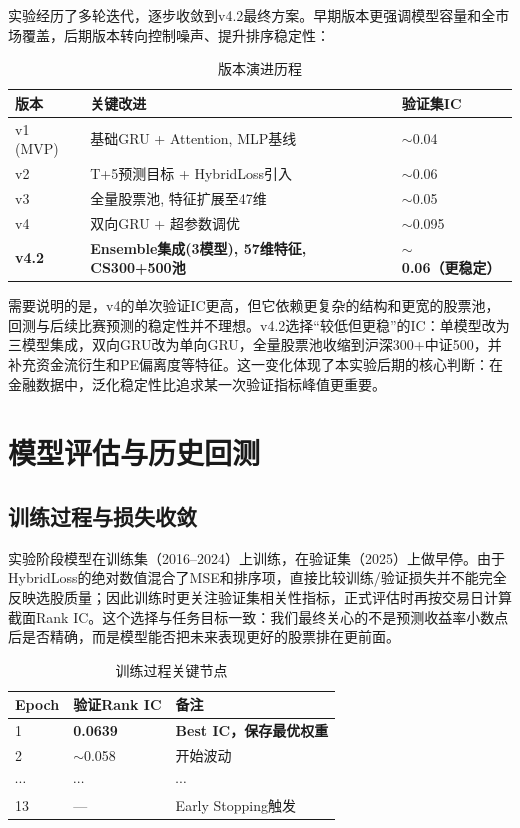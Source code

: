 \documentclass[10pt,a4paper]{ctexart}
\begin{document}
实验经历了多轮迭代，逐步收敛到v4.2最终方案。早期版本更强调模型容量和全市场覆盖，后期版本转向控制噪声、提升排序稳定性：

\begin{table}[htbp]
    \centering
    \caption{版本演进历程}
    \small
    \begin{tabular}{p{2.0cm}p{9.0cm}p{3.0cm}}
        \toprule
        版本 & 关键改进 & 验证集IC \\
        \midrule
        v1 (MVP) & 基础GRU + Attention, MLP基线 & $\sim$0.04 \\
        v2 & T+5预测目标 + HybridLoss引入 & $\sim$0.06 \\
        v3 & 全量股票池, 特征扩展至47维 & $\sim$0.05 \\
        v4 & 双向GRU + 超参数调优 & $\sim$0.095 \\
        \textbf{v4.2} & \textbf{Ensemble集成(3模型), 57维特征, CS300+500池} & \textbf{$\sim$0.06（更稳定）} \\
        \bottomrule
    \end{tabular}
\end{table}

需要说明的是，v4的单次验证IC更高，但它依赖更复杂的结构和更宽的股票池，回测与后续比赛预测的稳定性并不理想。v4.2选择“较低但更稳”的IC：单模型改为三模型集成，双向GRU改为单向GRU，全量股票池收缩到沪深300+中证500，并补充资金流衍生和PE偏离度等特征。这一变化体现了本实验后期的核心判断：在金融数据中，泛化稳定性比追求某一次验证指标峰值更重要。

\section{模型评估与历史回测}

\subsection{训练过程与损失收敛}

实验阶段模型在训练集（2016--2024）上训练，在验证集（2025）上做早停。由于HybridLoss的绝对数值混合了MSE和排序项，直接比较训练/验证损失并不能完全反映选股质量；因此训练时更关注验证集相关性指标，正式评估时再按交易日计算截面Rank IC。这个选择与任务目标一致：我们最终关心的不是预测收益率小数点后是否精确，而是模型能否把未来表现更好的股票排在更前面。

\begin{table}[htbp]
    \centering
    \caption{训练过程关键节点}
    \begin{tabular}{lll}
        \toprule
        Epoch & 验证Rank IC & 备注 \\
        \midrule
        1 & \textbf{0.0639} & \textbf{Best IC，保存最优权重} \\
        2 & $\sim$0.058 & 开始波动 \\
        $\cdots$ & $\cdots$ & $\cdots$ \\
        13 & --- & Early Stopping触发 \\
        \bottomrule
    \end{tabular}
\end{table}
\end{document}
